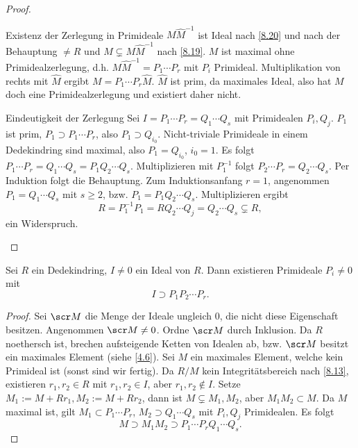 \begin{st}
\begin{proof}
\begin{seg}{Existenz der Zerlegung in Primideale}
			$M \hat M^{-1}$ ist Ideal nach \ref{8.20} und nach der Behauptung $\neq R$ und $M \subsetneq M \hat M^{-1}$ nach \ref{8.19}.
			$M$ ist maximal ohne Primidealzerlegung, d.h. $M \hat M^{-1} = P_1 \dotsb P_r$ mit $P_i$ Primideal.
			Multiplikation von rechts mit $\hat M$ ergibt $M = P_1 \dotsb P_r \hat M$.
			$\hat M$ ist prim, da maximales Ideal, also hat $M$ doch eine Primidealzerlegung und existiert daher nicht.
		\end{seg}
		\begin{seg}{Eindeutigkeit der Zerlegung}
			Sei $I = P_1 \dotsb P_r = Q_1 \dotsb Q_s$ mit Primidealen $P_i, Q_j$.
			$P_1$ ist prim, $P_1 \supset P_1 \dotsb P_r$, also $P_1 \supset Q_{i_0}$.
			Nicht-triviale Primideale in einem Dedekindring sind maximal, also $P_1 = Q_{i_0}$, \oBdA $i_0 = 1$.
			Es folgt $P_1 \dotsb P_r = Q_1 \dotsb Q_s = P_1 Q_2 \dotsb Q_s$.
			Multiplizieren mit $P_1^{-1}$ folgt $P_2 \dotsb P_r = Q_2 \dotsb Q_s$.
			Per Induktion folgt die Behauptung.
			Zum Induktionsanfang $r = 1$, angenommen $P_1 = Q_1 \dotsb Q_s$ mit $s \ge 2$, bzw. $P_1 = P_1 Q_2 \dotsb Q_s$.
			Multiplizieren ergibt
			\[
				R = P_1^{-1} P_1
				= R Q_2 \dotsb Q_j
				= Q_2 \dotsb Q_s \subsetneq R,
			\]
			ein Widerspruch.
		\end{seg}
	\end{proof}
\end{st}

\begin{lem} \label{8.18}
	Sei $R$ ein Dedekindring, $I \neq 0$ ein Ideal von $R$.
	Dann existieren Primideale $P_i \neq 0$ mit
	\[
		I \supset P_1 P_2 \dotsb P_r.
	\]
	\begin{proof}
		Sei $\scr M$ die Menge der Ideale ungleich 0, die nicht diese Eigenschaft besitzen.
		Angenommen $\scr M \neq 0$.
		Ordne $\scr M$ durch Inklusion.
		Da $R$ noethersch ist, brechen aufsteigende Ketten von Idealen ab, bzw. $\scr M$ besitzt ein maximales Element (siehe \ref{4.6}).
		Sei $M$ ein maximales Element, welche kein Primideal ist (sonst sind wir fertig).
		Da $R/M$ kein Integritätsbereich nach \ref{8.13}, existieren $r_1, r_2 \in R$ mit $r_1, r_2 \in I$, aber $r_1, r_2 \not\in I$.
		Setze $M_1 := M + Rr_1, M_2 := M + Rr_2$, dann ist $M \subsetneq M_1, M_2$, aber $M_1 M_2 \subset M$.
		Da $M$ maximal ist, gilt $M_1 \subset P_1 \dotsb P_r$, $M_2 \supset Q_1 \dotsb Q_s$ mit $P_i, Q_j$ Primidealen.
		Es folgt
		\[
			M \supset M_1 M_2 \supset P_1 \dotsb P_r Q_1 \dotsb Q_s.
		\]
	\end{proof}
\end{lem}

